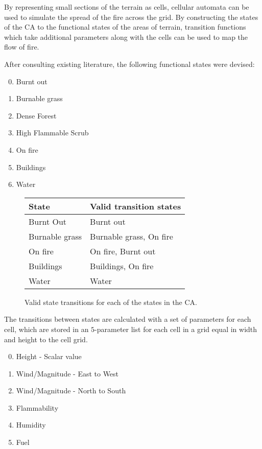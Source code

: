 \documentclass[11pt, a4paper, titlepage]{article}
\begin{document}
By representing small sections of the terrain as cells, cellular automata can be used to simulate the spread of the fire across the grid. By constructing the states of the CA to the functional states of the areas of terrain, transition functions which take additional parameters along with the cells can be used to map the flow of fire.

After consulting existing literature, the following functional states were devised:

\begin{enumerate}
  \setcounter{enumi}{-1}
  \item Burnt out
  \item Burnable grass
  \item Dense Forest
  \item High Flammable Scrub
  \item On fire
  \item Buildings
  \item Water
\end{enumerate}


\begin{figure}[h]
  \centering
    \begin{tabular}{ || l | l ||}
      \hline
      \textbf{State}            &  \textbf{Valid transition states}  \\ 
      \hline
      Burnt Out        &  Burnt out           \\       
      Burnable grass         &  Burnable grass, On fire   \\
      On fire          &  On fire, Burnt out  \\   
      Buildings          &  Buildings, On fire  \\   
      Water     &  Water        \\
      \hline
 
    \end{tabular}
  \caption{Valid state transitions for each of the states in the CA.}
  \label{Valid state transitions}
\end{figure}


The transitions between states are calculated with a set of parameters for each cell, which are stored in an $5$-parameter list for each cell in a grid equal in width and height to the cell grid. 

\begin{enumerate}
  \setcounter{enumi}{-1}
  \item Height - Scalar value
  \item Wind/Magnitude - East to West
  \item Wind/Magnitude - North to South
  \item Flammability
  \item Humidity
  \item Fuel
\end{enumerate}
\end{document}
